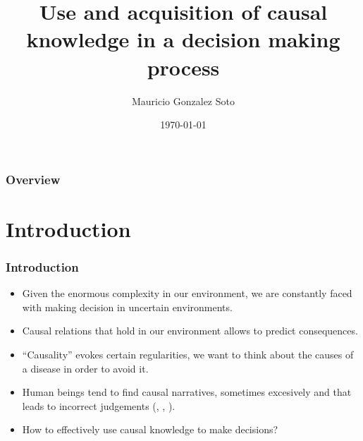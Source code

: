 \documentclass{beamer}
\title[Short title]{Use and acquisition of causal knowledge in a decision making process} %
\author{Mauricio Gonzalez Soto} %
\institute[INAOE] %
{
Instituto Nacional de Astrofísica Óptica y Electrónica \\ %
\medskip
\textit{mauricio@inaoep.mx} %
}
\date{\today} %
\theoremstyle{plain}
\begin{document}
\begin{frame}
\titlepage %
\end{frame}

\begin{frame}[allowframebreaks]
\frametitle{Overview} %
\tableofcontents %
\end{frame}


\section{Introduction} 
\begin{frame}
\frametitle{Introduction}
\begin{itemize}
\item Given the enormous complexity in our environment, we are constantly faced with making decision in uncertain environments.
\item Causal relations that hold in our environment allows to predict consequences.
\item “Causality” evokes certain regularities, we want to think about the causes of a disease in order to avoid it. 
\item Human beings tend to find causal narratives, sometimes excesively and that leads to incorrect judgements (\cite{tversky1977causal}, \cite{tversky1980causal}, \cite{kahneman2011thinking}).
\item How to effectively use causal knowledge to make decisions?
\end{itemize}
\end{frame}
\end{document}

